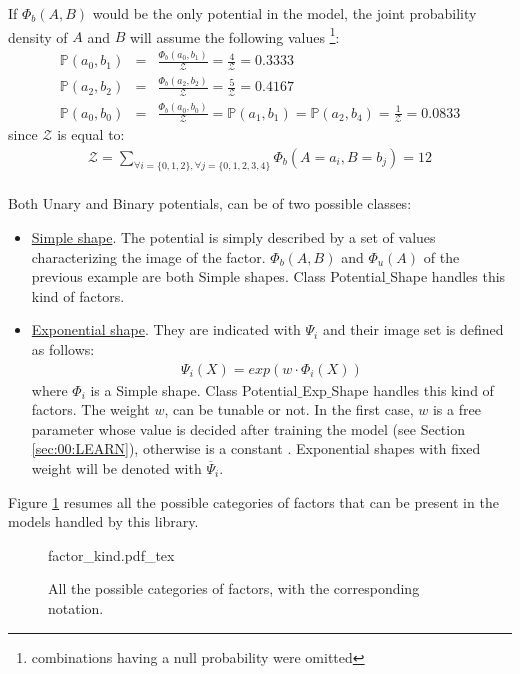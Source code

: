 If $\Phi _b(A,B)$ would be the only potential in the model, the joint probability density of $A$ and $B$ will assume the following values \footnote{combinations having a null probability were omitted}:
\begin{eqnarray}
\mathbb{P}(a_0 , b_1) &=& \frac{ \Phi_b(a_0 , b_1) }{\mathcal{Z}} = \frac{ 4 }{\mathcal{Z}} = 0.3333 \label{eq:00:ex_prob_cmpt_1} \\
\mathbb{P}(a_2 , b_2) &=& \frac{ \Phi_b(a_2 , b_2) }{\mathcal{Z}} = \frac{ 5 }{\mathcal{Z}} = 0.4167 \label{eq:00:ex_prob_cmpt_2} \\
\mathbb{P}(a_0 , b_0) &=& \frac{ \Phi_b(a_0 , b_0) }{\mathcal{Z}} = \mathbb{P}(a_1 , b_1)=\mathbb{P}(a_2 , b_4)= \frac{ 1 }{\mathcal{Z}} = 0.0833 \label{eq:00:ex_prob_cmpt_3}
\end{eqnarray}
since $\mathcal{Z}$ is equal to:
\begin{eqnarray}
\mathcal{Z} = \sum _{ \forall i=\lbrace 0,1,2 \rbrace , \forall j= \lbrace 0,1,2,3,4 \rbrace } \Phi _b(A = a_i,B = b_j) = 12
\end{eqnarray}
\\
Both Unary and Binary potentials, can be of two possible classes:
\begin{itemize}
\item \underline{Simple shape}. The potential is simply described by a set of values characterizing the image of the factor. $\Phi _b(A,B)$ and $\Phi _u(A)$ of the previous example are both Simple shapes. Class Potential$\_$Shape handles this kind of factors.
\item \underline{Exponential shape}. They are indicated with $\Psi_i$ and their image set is defined as follows:
\begin{eqnarray}
\Psi _i(X) = exp(w \cdot \Phi_i(X) ) 
\label{eq:00:exp_w}
\end{eqnarray}
where $\Phi_i$ is a Simple shape. Class Potential$\_$Exp$\_$Shape handles this kind of factors.
The weight $w$, can be tunable or not. In the first case, $w$ is a free parameter whose value is decided after training the model (see Section \ref{sec:00:LEARN}), otherwise is a constant . Exponential shapes with fixed weight will be denoted with $\overline{\Psi}_i$. 
\end{itemize}

Figure \ref{fig:00:factor_kind} resumes all the possible categories of factors that can be present in the models handled by this library.

\begin{figure}
	\centering
\def\svgwidth{0.95 \columnwidth}
{factor_kind.pdf_tex} 
	\caption{All the possible categories of factors, with the corresponding notation.}
	\label{fig:00:factor_kind}
\end{figure} 

